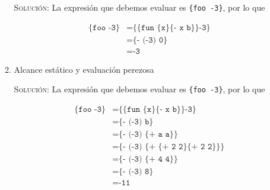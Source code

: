 \documentclass[letterpaper,11pt]{article}
\begin{document}
\begin{enumerate}
\begin{enumerate}
        \textsc{Solución:} La expresión que debemos evaluar es 
        \texttt{\{foo -3\}}, por lo que 
        \begin{table}[h]
            \parbox{.6\linewidth}{
            \centering
            \begin{align*}
                \texttt{\{foo -3\}}
                &= \texttt{\{\{fun \{x\} \{- x b\}\} -3\}} \\
                &= \texttt{\{- (-3) 0\}} \\ 
                &= \texttt{-3}
            \end{align*}
            }
            \hfill
            \parbox{.4\linewidth}{
            \centering
            \begin{drawstack}[scale=1.15]
            \end{drawstack}
            }
        \end{table}

        \item Alcance estático y evaluación perezosa

        \textsc{Solución:} La expresión que debemos evaluar es 
        \texttt{\{foo -3\}}, por lo que 
        \begin{table}[h]
            \parbox{.6\linewidth}{
            \centering
            \begin{align*}
                \texttt{\{foo -3\}}
                &= \texttt{\{\{fun \{x\} \{- x b\}\} -3\}} \\
                &= \texttt{\{- (-3) b\}} \\
                &= \texttt{\{- (-3) \{+ a a\}\}} \\
                &= \texttt{\{- (-3) \{+ \{+ 2 2\} \{+ 2 2\}\}\}} \\
                &= \texttt{\{- (-3) \{+ 4 4\}\}} \\
                &= \texttt{\{- (-3) 8\}} \\
                &= \texttt{-11}
            \end{align*}
            }
            \hfill
            \parbox{.4\linewidth}{
            \centering
            \begin{drawstack}[scale=1.15]
            \end{drawstack}
            }
        \end{table}


\end{enumerate}
\end{enumerate}
\end{document}
